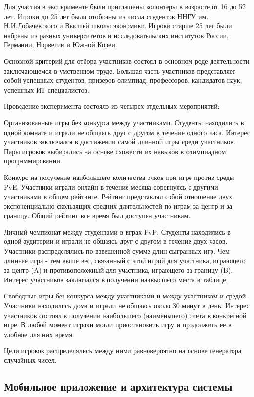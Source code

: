 Для участия в эксперименте были приглашены волонтеры в возрасте от 16 до 52 лет. 
Игроки до 25 лет были отобраны из числа студентов ННГУ им. Н.И.Лобачевского и Высшей школы экономики. 
Игроки старше 25 лет были набраны из разных университетов и исследовательских институтов России, Германии, Норвегии и Южной Кореи.

Основной критерий для отбора участников состоял в основном роде деятельности заключающемся в умственном труде.
Большая часть участников представляет собой успешных студентов, призеров олимпиад, профессоров, кандидатов наук, успешных ИТ-специалистов.

Проведение эксперимента состояло из четырех отдельных мероприятий:
\item Организованные игры без конкурса между участниками.
    Студенты находились в одной комнате и играли не общаясь друг с другом в течение одного часа. 
    Интерес участников заключался в достижении самой длинной игры среди участников. 
    Пары игроков выбирались на основе схожести их навыков в олимпиадном программировании.
\item Конкурс на получение наибольшего количества очков при игре против среды PvE.
    Участники играли онлайн в течение месяца соревнуясь с другими участниками в общем рейтинге.
    Рейтинг представлял собой отношение двух экспоненциально скользящих средних длительностей по играм за центр и за границу.
    Общий рейтинг все время был доступен участникам.
\item Личный чемпионат между студентами в играх PvP: 
    Студенты находились в одной аудитории и играли не общаясь друг с другом в течение двух часов. 
    Участники распределялись по взвешенной сумме длин сыгранных игр. 
    Чем длиннее игра - тем выше вес, связанный с этой игрой для участника, играющего за центр (A) и противоположный для участника, играющего за границу (B).
    Интерес участников заключался в получении наивысшего места в таблице.
\item Свободные игры без конкурса между участниками и между участником и средой.
      Участники находились дома и играли не общаясь около 30 минут в день. 
      Интерес участников состоял в получении наибольшего (наименьшего) счета в конкретной игре.
      В любой момент игроки могли приостановить игру и продолжить ее в удобное для них время.

Цели игроков распределялись между ними равновероятно на основе генератора случайных чисел.

\subsection{Мобильное приложение и архитектура системы}\label{subsec:ch1/sec3/sub6}

